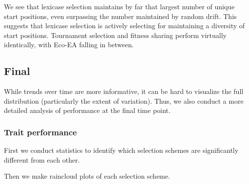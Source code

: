 \documentclass[]{book}
\newenvironment{Shaded}{\begin{snugshade}}{\end{snugshade}}
\newcommand{\CommentTok}[1]{\textcolor[rgb]{0.56,0.35,0.01}{\textit{#1}}}
\newcommand{\DataTypeTok}[1]{\textcolor[rgb]{0.13,0.29,0.53}{#1}}
\newcommand{\DecValTok}[1]{\textcolor[rgb]{0.00,0.00,0.81}{#1}}
\newcommand{\KeywordTok}[1]{\textcolor[rgb]{0.13,0.29,0.53}{\textbf{#1}}}
\newcommand{\NormalTok}[1]{#1}
\newcommand{\OperatorTok}[1]{\textcolor[rgb]{0.81,0.36,0.00}{\textbf{#1}}}
\newcommand{\StringTok}[1]{\textcolor[rgb]{0.31,0.60,0.02}{#1}}
\begin{document}
We see that lexicase selection maintains by far that largest number of unique start positions, even surpassing the number maintained by random drift. This suggests that lexicase selection is actively selecting for maintaining a diversity of start positions. Tournament selection and fitness sharing perform virtually identically, with Eco-EA falling in between.

\hypertarget{final}{%
\subsection{Final}\label{final}}

While trends over time are more informative, it can be hard to visualize the full distribution (particularly the extent of variation). Thus, we also conduct a more detailed analysis of performance at the final time point.

\hypertarget{trait-performance-1}{%
\subsubsection{Trait performance}\label{trait-performance-1}}

First we conduct statistics to identify which selection schemes are significantly different from each other.

\begin{Shaded}
\end{Shaded}

Then we make raincloud plots of each selection scheme.
\end{document}
